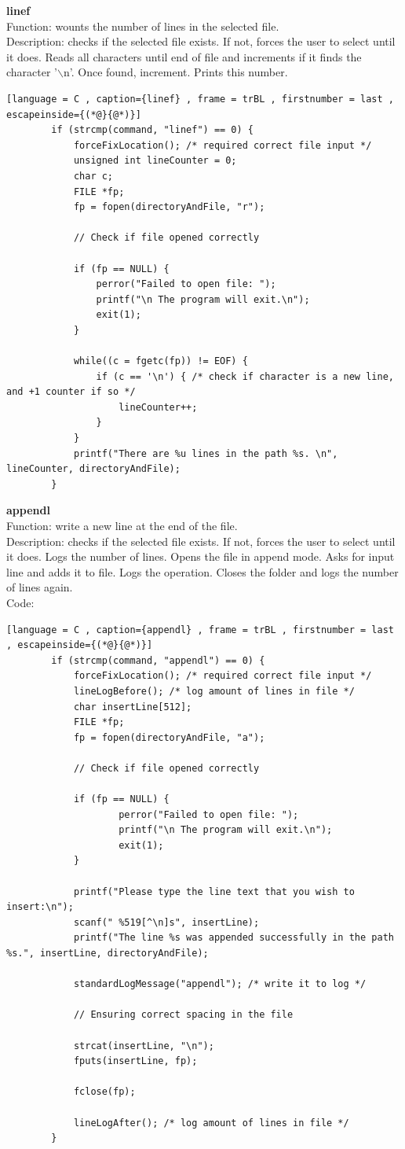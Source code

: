 \documentclass[a4paper]{article}
\theoremstyle{plain}
\theoremstyle{definition}
\theoremstyle{remark}
\begin{document}
\textbf{linef} \\
Function: wounts the number of lines in the selected file. \\
Description: checks if the selected file exists. If not, forces the user to select until it does. Reads all characters until end of file and increments if it finds the character '$\backslash $n'. Once found, increment. Prints this number. \\
\begin{lstlisting}[language = C , caption={linef} , frame = trBL , firstnumber = last , escapeinside={(*@}{@*)}]
		if (strcmp(command, "linef") == 0) {
			forceFixLocation(); /* required correct file input */
			unsigned int lineCounter = 0; 
			char c; 
			FILE *fp; 
			fp = fopen(directoryAndFile, "r"); 

			// Check if file opened correctly

			if (fp == NULL) {
    			perror("Failed to open file: ");
				printf("\n The program will exit.\n");
    			exit(1);
			}

			while((c = fgetc(fp)) != EOF) {
				if (c == '\n') { /* check if character is a new line, and +1 counter if so */
					lineCounter++;
				}
			}
			printf("There are %u lines in the path %s. \n", lineCounter, directoryAndFile);
		}
\end{lstlisting}

\textbf{appendl} \\
Function: write a new line at the end of the file. \\
Description: checks if the selected file exists. If not, forces the user to select until it does. Logs the number of lines. Opens the file in append mode. Asks for input line and adds it to file. Logs the operation. Closes the folder and logs the number of lines again. \\
Code:
\begin{lstlisting}[language = C , caption={appendl} , frame = trBL , firstnumber = last , escapeinside={(*@}{@*)}]
		if (strcmp(command, "appendl") == 0) {
			forceFixLocation(); /* required correct file input */
			lineLogBefore(); /* log amount of lines in file */
			char insertLine[512];
			FILE *fp;
			fp = fopen(directoryAndFile, "a"); 

			// Check if file opened correctly

			if (fp == NULL) {
    				perror("Failed to open file: ");
    				printf("\n The program will exit.\n");
    				exit(1);
			}

			printf("Please type the line text that you wish to insert:\n");
			scanf(" %519[^\n]s", insertLine);
			printf("The line %s was appended successfully in the path %s.", insertLine, directoryAndFile);

			standardLogMessage("appendl"); /* write it to log */

			// Ensuring correct spacing in the file

			strcat(insertLine, "\n");
			fputs(insertLine, fp);

			fclose(fp);

			lineLogAfter(); /* log amount of lines in file */
		}
\end{lstlisting}
\end{document}
